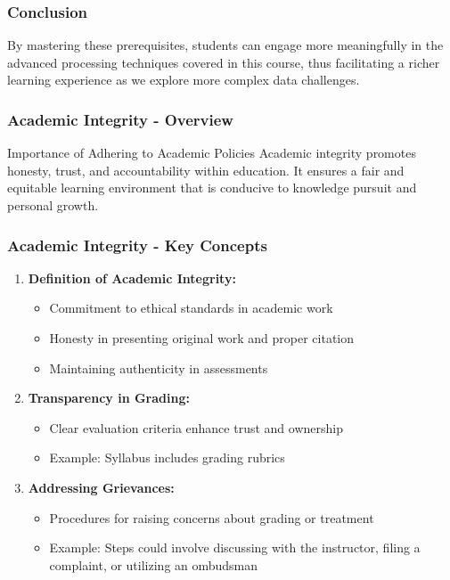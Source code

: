 \documentclass[aspectratio=169]{beamer}
\begin{document}
\begin{frame}
    \frametitle{Conclusion}
    
    By mastering these prerequisites, students can engage more meaningfully in the advanced processing techniques covered in this course, thus facilitating a richer learning experience as we explore more complex data challenges.
\end{frame}

\begin{frame}[fragile]
    \frametitle{Academic Integrity - Overview}
    \begin{block}{Importance of Adhering to Academic Policies}
        Academic integrity promotes honesty, trust, and accountability within education. It ensures a fair and equitable learning environment that is conducive to knowledge pursuit and personal growth.
    \end{block}
\end{frame}

\begin{frame}[fragile]
    \frametitle{Academic Integrity - Key Concepts}
    \begin{enumerate}
        \item \textbf{Definition of Academic Integrity:}
        \begin{itemize}
            \item Commitment to ethical standards in academic work
            \item Honesty in presenting original work and proper citation
            \item Maintaining authenticity in assessments
        \end{itemize}
        
        \item \textbf{Transparency in Grading:}
        \begin{itemize}
            \item Clear evaluation criteria enhance trust and ownership
            \item Example: Syllabus includes grading rubrics
        \end{itemize}
        
        \item \textbf{Addressing Grievances:}
        \begin{itemize}
            \item Procedures for raising concerns about grading or treatment
            \item Example: Steps could involve discussing with the instructor, filing a complaint, or utilizing an ombudsman
        \end{itemize}
    \end{enumerate}
\end{frame}
\end{document}
